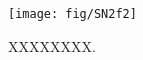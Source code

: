 \begin{figure}
\centering
\texttt{[image: fig/SN2f2]}
\caption[xxx]{XXXXXXXX.}
\label{fig:SN2f2}
\end{figure}